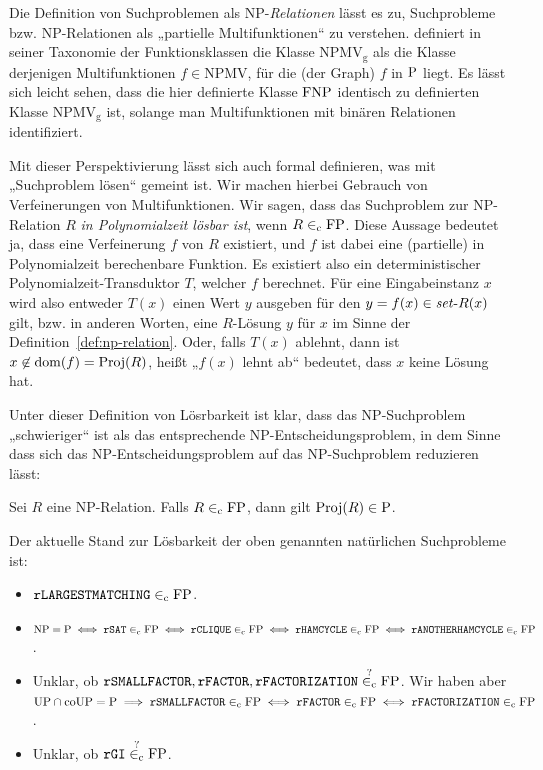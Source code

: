 Die Definition von Suchproblemen als NP-\emph{Relationen} lässt es zu, Suchprobleme bzw. NP-Relationen als „partielle Multifunktionen“ zu verstehen.
\textcite{selman_taxonomy_1994} definiert in seiner Taxonomie der Funktionsklassen die Klasse $\mathrm{NPMV_g}$ als die Klasse derjenigen Multifunktionen $f\in\mathrm{NPMV}$, für die (der Graph) $f$ in $\P$ liegt.
Es lässt sich leicht sehen, dass die hier definierte Klasse $\FNP$ identisch zu \citeauthor{selman_taxonomy_1994} definierten Klasse $\mathrm{NPMV_g}$ ist, solange man Multifunktionen mit binären Relationen identifiziert.

Mit dieser Perspektivierung lässt sich auch formal definieren, was mit „Suchproblem lösen“ gemeint ist. Wir machen hierbei Gebrauch von Verfeinerungen von Multifunktionen.
Wir sagen, dass das Suchproblem zur NP-Relation $R$ \emph{in Polynomialzeit lösbar ist}, wenn $R\inc \mathrm{FP}$.
Diese Aussage bedeutet ja, dass eine Verfeinerung $f$ von $R$ existiert, und $f$ ist dabei eine (partielle) in Polynomialzeit berechenbare Funktion. Es existiert also ein deterministischer Polynomialzeit-Transduktor $T$, welcher $f$ berechnet.
Für eine Eingabeinstanz $x$ wird also entweder $T(x)$ einen Wert $y$ ausgeben für den $y=f(x)\in\fset{}R(x)$ gilt, bzw. in anderen Worten, eine $R$-Lösung $y$ für $x$ im Sinne der Definition~\ref{def:np-relation}.
Oder, falls $T(x)$ ablehnt, dann ist $x\not\in\dom(f)=\Proj(R)$, heißt „$f(x)$ lehnt ab“ bedeutet, dass $x$ keine Lösung hat.

Unter dieser Definition von Lösrbarkeit ist klar, dass das NP-Suchproblem „schwieriger“ ist als das entsprechende NP-Entscheidungsproblem, in dem Sinne dass sich das NP-Entscheidungsproblem auf das NP-Suchproblem reduzieren lässt:
\begin{observation}\label{obs:search-stronger-than-decision}
    Sei $R$ eine NP-Relation. Falls $R\inc\FP$, dann gilt $\Proj(R)\in\P$.
\end{observation}

Der aktuelle Stand zur Lösbarkeit der oben genannten natürlichen Suchprobleme ist:\label{page:lösbarkeit}
\begin{itemize}\raggedright
    \item $\mathtt{rLARGESTMATCHING}\inc\FP$.
    \item $\NP=\P \iff \mathtt{rSAT}\inc\FP \iff \mathtt{rCLIQUE}\inc\FP \iff \mathtt{rHAMCYCLE}\inc\FP \iff \mathtt{rANOTHERHAMCYCLE}\inc\FP$.
    \item Unklar, ob $\mathtt{rSMALLFACTOR}, \mathtt{rFACTOR}, \mathtt{rFACTORIZATION}\stackrel{\smash{?}}{\inc}\FP$. Wir haben aber $\UP\cap\coUP=\P \implies \mathtt{rSMALLFACTOR}\inc \FP \iff \mathtt{rFACTOR}\inc\FP \iff \mathtt{rFACTORIZATION}\inc\FP$.
    \item Unklar, ob $\mathtt{rGI}\stackrel{\smash{?}}{\inc}{\FP}$.
\end{itemize}

